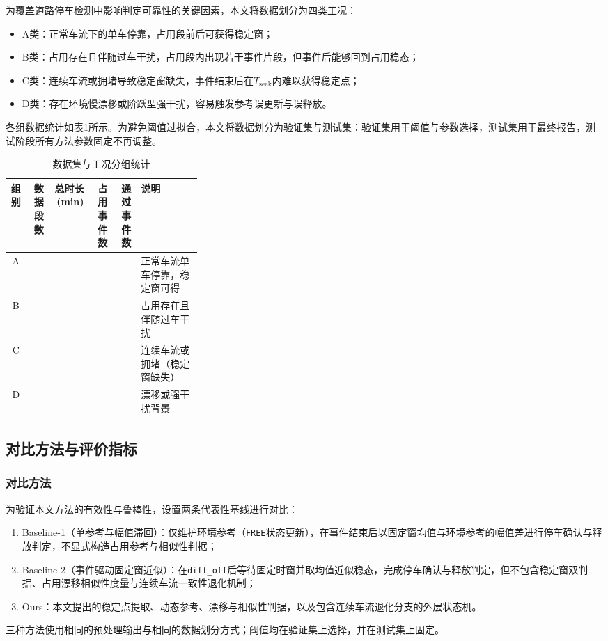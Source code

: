 \documentclass{xdupgthesis}
\begin{document}
为覆盖道路停车检测中影响判定可靠性的关键因素，本文将数据划分为四类工况：
\begin{itemize}
  \item A类：正常车流下的单车停靠，占用段前后可获得稳定窗；
  \item B类：占用存在且伴随过车干扰，占用段内出现若干事件片段，但事件后能够回到占用稳态；
  \item C类：连续车流或拥堵导致稳定窗缺失，事件结束后在$T_{\mathrm{seek}}$内难以获得稳定点；
  \item D类：存在环境慢漂移或阶跃型强干扰，容易触发参考误更新与误释放。
\end{itemize}

各组数据统计如表\ref{tab:ch4_dataset}所示。为避免阈值过拟合，本文将数据划分为验证集与测试集：验证集用于阈值与参数选择，测试集用于最终报告，测试阶段所有方法参数固定不再调整。

\begin{table}[t]
\centering
\caption{数据集与工况分组统计}
\label{tab:ch4_dataset}
\begin{tabular}{c r r r r p{0.32\linewidth}}
\hline
组别 & 数据段数 & 总时长(min) & 占用事件数 & 通过事件数 & 说明 \\
\hline
A &  &  &  &  & 正常车流单车停靠，稳定窗可得 \\
B &  &  &  &  & 占用存在且伴随过车干扰 \\
C &  &  &  &  & 连续车流或拥堵（稳定窗缺失） \\
D &  &  &  &  & 漂移或强干扰背景 \\
\hline
\end{tabular}
\end{table}

\subsection{对比方法与评价指标}
\label{subsec:ch4_metric}

\subsubsection{对比方法}

为验证本文方法的有效性与鲁棒性，设置两条代表性基线进行对比：
\begin{enumerate}
  \item Baseline-1（单参考与幅值滞回）：仅维护环境参考（\texttt{FREE}状态更新），在事件结束后以固定窗均值与环境参考的幅值差进行停车确认与释放判定，不显式构造占用参考与相似性判据；
  \item Baseline-2（事件驱动固定窗近似）：在\texttt{diff\_off}后等待固定时窗并取均值近似稳态，完成停车确认与释放判定，但不包含稳定窗双判据、占用漂移相似性度量与连续车流一致性退化机制；
  \item Ours：本文提出的稳定点提取、动态参考、漂移与相似性判据，以及包含连续车流退化分支的外层状态机。
\end{enumerate}
三种方法使用相同的预处理输出与相同的数据划分方式；阈值均在验证集上选择，并在测试集上固定。
\end{document}
